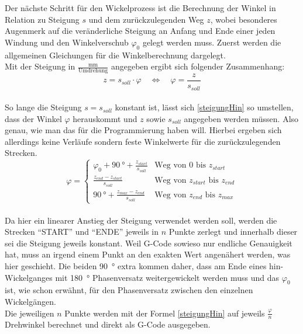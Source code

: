 \documentclass[paper=A4,pagesize,DIV=18, 12pt,listof=totoc,bibliography=totoc,headings=optiontohead,open=any]{article}
\begin{document}
Der nächste Schritt für den Wickelprozess ist die Berechnung der Winkel in Relation zu Steigung $s$ und dem zurückzulegenden Weg $z$, wobei besonderes Augenmerk auf die veränderliche Steigung an Anfang und Ende einer jeden Windung und den Winkelverschub $\varphi_0$ gelegt werden muss. Zuerst werden die allgemeinen Gleichungen für die Winkelberechnung dargelegt.\\
Mit der Steigung in $\frac{\text{mm}}{\text{Umdrehung}}$ angegeben ergibt sich folgender Zusammenhang:\\
\begin{equation}\label{SteigungMalWinkel}
	z = s_{soll} \cdot \varphi \quad \iff \quad \varphi = \frac{z}{s_{soll}}
\end{equation}\\
So lange die Steigung $s = s_{soll}$ konstant ist, lässt sich \eqref{steigungHin} so umstellen, dass der Winkel $\varphi$ herauskommt und $z$ sowie $s_{soll}$ angegeben werden müssen. Also genau, wie man das für die Programmierung haben will. Hierbei ergeben sich allerdings keine Verläufe sondern feste Winkelwerte für die zurückzulegenden Strecken.
\begin{equation}\label{GesamtwegeHinRück}
	\varphi =
	\begin{cases}
		\varphi_0 + \SI{90}{\degree} + \frac{z_{start}}{s_{soll}} & \text{Weg von 0 bis $z_{start}$}\\ 
		\frac{z_{end} - z_{start}}{s_{soll}} & \text{Weg von $z_{start}$ bis $z_{end}$}\\
		\SI{90}{\degree} + \frac{z_{max} - z_{end}}{s_{soll}} & \text{Weg von $z_{end}$ bis $z_{max}$}
	\end{cases}	
\end{equation}\\
Da hier ein linearer Anstieg der Steigung verwendet werden soll, werden die Strecken \enquote{START} und \enquote{ENDE} jeweils in $n$ Punkte zerlegt und innerhalb dieser sei die Steigung jeweils konstant. Weil G-Code sowieso nur endliche Genauigkeit hat, muss an irgend einem Punkt an den exakten Wert angenähert werden, was hier geschieht. Die beiden \SI{90}{\degree} extra kommen daher, dass am Ende eines hin-Wickelganges mit \SI{180}{\degree} Phasenversatz weitergewickelt werden muss und das $\varphi_0$ ist, wie schon erwähnt, für den Phasenversatz zwischen den einzelnen Wickelgängen.\\
Die jeweiligen $n$ Punkte werden mit der Formel \eqref{steigungHin} auf jeweils $\frac{\varphi}{n}$ Drehwinkel berechnet und direkt als G-Code ausgegeben.
\end{document}

